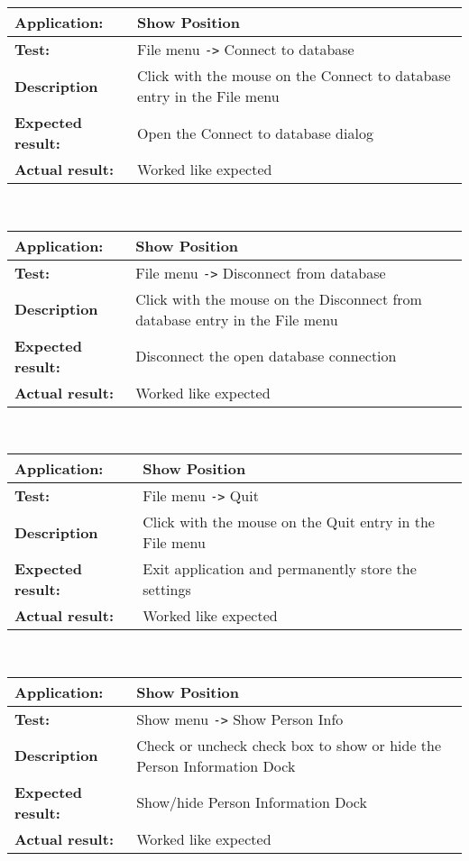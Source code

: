    \begin{tabular}{|p{3.5cm}|p{10.5cm}|}
    \hline
     \textbf{Application:}	& Show Position\\
    \hline
     \textbf{Test:}		& File menu \verb=->= Connect to database\\
    \hline
     \textbf{Description}	& Click with the mouse on the Connect to database entry in the File menu\\
    \hline
     \textbf{Expected result:}	& Open the Connect to database dialog\\
    \hline
     \textbf{Actual result:}	& Worked like expected\\
    \hline
   \end{tabular}\\
   \begin{tabular}{|p{3.5cm}|p{10.5cm}|}
    \hline
     \textbf{Application:}	& Show Position\\
    \hline
     \textbf{Test:}		& File menu \verb=->= Disconnect from database\\
    \hline
     \textbf{Description}	& Click with the mouse on the Disconnect from database entry in the File menu\\
    \hline
     \textbf{Expected result:}	& Disconnect the open database connection\\
    \hline
     \textbf{Actual result:}	& Worked like expected\\
    \hline
   \end{tabular}\\
   \begin{tabular}{|p{3.5cm}|p{10.5cm}|}
    \hline
     \textbf{Application:}	& Show Position\\
    \hline
     \textbf{Test:}		& File menu \verb=->= Quit\\
    \hline
     \textbf{Description}	& Click with the mouse on the Quit entry in the File menu\\
    \hline
     \textbf{Expected result:}	& Exit application and permanently store the settings\\
    \hline
     \textbf{Actual result:}	& Worked like expected\\
    \hline
   \end{tabular}\\
   \begin{tabular}{|p{3.5cm}|p{10.5cm}|}
    \hline
     \textbf{Application:}	& Show Position\\
    \hline
     \textbf{Test:}		& Show menu \verb=->= Show Person Info\\
    \hline
     \textbf{Description}	& Check or uncheck check box to show or hide the Person Information Dock\\
    \hline
     \textbf{Expected result:}	& Show/hide Person Information Dock\\
    \hline
     \textbf{Actual result:}	& Worked like expected\\
    \hline
   \end{tabular}\\
